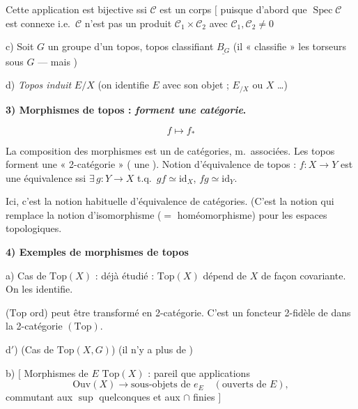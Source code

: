 \documentclass[11pt,a4paper]{article}
\begin{document}
Cette application est bijective ssi $\mathcal{C}$ est un corps
$\bigl[$ puisque d'abord que  $\operatorname{Spec}
\mathcal{C}$ est connexe i.e.\ $\mathcal{C}$ n'est pas un produit $\mathcal{C}_{1}
\times \mathcal{C}_{2}$ avec $\mathcal{C}_{1}, \mathcal{C}_{2} \neq 0$

c) Soit $G$ un groupe d'un topos, topos classifiant $\underline{B_{G}}$ (il
« classifie » les torseurs sous $G$ --- mais \ill{})

d) \emph{Topos induit} $E/X$ (on identifie \ill{} $E$ avec son objet
\ill{} ; $E_{/X}$ ou $X$ \ldots)

\textbf{3) Morphismes de topos : \emph{forment une catégorie}.}

\[
f \longmapsto f_{*}
\]


La composition des morphismes est un \ill{}  de catégories,
m.\ associées. Les topos forment une « 2-catégorie » (\ill{} une
). Notion d'équivalence de topos : $f : X \to Y$ est une
équivalence ssi $\exists\, g : Y \to X$ t.q.\ $gf \simeq \mathrm{id}_{X}$,
$fg \simeq \mathrm{id}_{Y}$.

Ici, c'est la notion habituelle d'équivalence de catégories. (C'est la notion qui
remplace la notion d'isomorphisme ($=$ homéomorphisme) pour les espaces
topologiques.


\textbf{4) Exemples de morphismes de topos}

a) Cas de $\mathrm{Top}(X)$ : déjà étudié : $\mathrm{Top}(X)$ dépend de $X$ de
façon covariante. On les identifie.

($\mathrm{Top}$ ord) \struck{\ill{}} peut être transformé en 2-catégorie. C'est un
foncteur 2-fidèle de \ill{} dans la 2-catégorie $(\mathrm{Top})$.

d$'$) (Cas de $\mathrm{Top}(X,G)$) (il n'y a plus de )

b) $\bigl[$ Morphismes de $E$  $\mathrm{Top}(X)$ : pareil que
 \ill{} applications
\[
\mathrm{Ouv}(X) \longrightarrow \text{sous-objets de } e_{E}
\quad (\text{ouverts de } E),
\]
commutant aux $\sup$ quelconques et aux $\cap$ finies $\bigr]$
\end{document}
